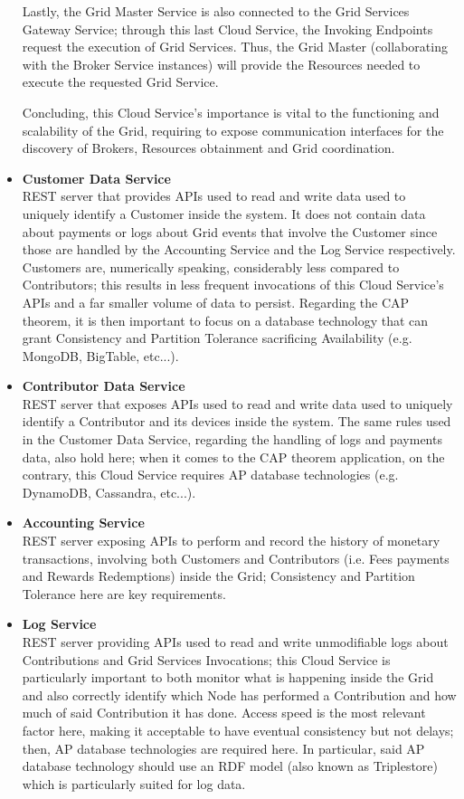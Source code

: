 \begin{itemize}
    Lastly, the Grid Master Service is also connected to the Grid Services Gateway Service; through this last Cloud Service, the Invoking Endpoints request the execution of Grid Services. Thus, the Grid Master (collaborating with the Broker Service instances) will provide the Resources needed to execute the requested Grid Service.

    Concluding, this Cloud Service's importance is vital to the functioning and scalability of the Grid, requiring to expose communication interfaces for the discovery of Brokers, Resources obtainment and Grid coordination.

    \item \textbf{Customer Data Service}\\
    REST server that provides APIs used to read and write data used to uniquely identify a Customer inside the system. It does not contain data about payments or logs about Grid events that involve the Customer since those are handled by the Accounting Service and the Log Service respectively.\\
    Customers are, numerically speaking, considerably less compared to Contributors; this results in less frequent invocations of this Cloud Service's APIs and a far smaller volume of data to persist. Regarding the CAP theorem, it is then important to focus on a database technology that can grant Consistency and Partition Tolerance sacrificing Availability (e.g. MongoDB, BigTable, etc...).

    \item \textbf{Contributor Data Service}\\
    REST server that exposes APIs used to read and write data used to uniquely identify a Contributor and its devices inside the system. The same rules used in the Customer Data Service, regarding the handling of logs and payments data, also hold here; when it comes to the CAP theorem application, on the contrary, this Cloud Service requires AP database technologies (e.g. DynamoDB, Cassandra, etc...).

    \item \textbf{Accounting Service}\\
    REST server exposing APIs to perform and record the history of monetary transactions, involving both Customers and Contributors (i.e. Fees payments and Rewards Redemptions) inside the Grid; Consistency and Partition Tolerance here are key requirements.

    \item \textbf{Log Service}\\
    REST server providing APIs used to read and write unmodifiable logs about Contributions and Grid Services Invocations; this Cloud Service is particularly important to both monitor what is happening inside the Grid and also correctly identify which Node has performed a Contribution and how much of said Contribution it has done. Access speed is the most relevant factor here, making it acceptable to have eventual consistency but not delays; then, AP database technologies are required here. In particular, said AP database technology should use an RDF model (also known as Triplestore) which is particularly suited for log data.
\end{itemize}

